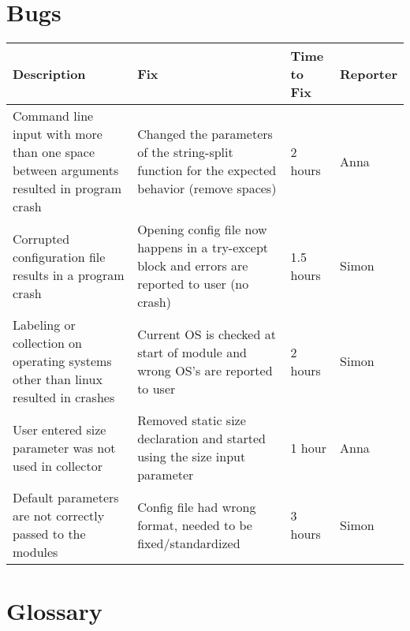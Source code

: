 \documentclass[parskip=full]{scrartcl}
\begin{document}
\section{Bugs}
\begin{tabular}{|p{4.5cm}|p{4.5cm}|p{2cm}|p{1.5cm}|}

\hline

 Description  & Fix & Time to Fix & Reporter  \\

\hline

Command line input with more than one space between arguments resulted in program crash & 
Changed the parameters of the string-split function for the expected behavior (remove spaces) &
2 hours &
Anna \\

\hline

Corrupted configuration file results in a program crash &
Opening config file now happens in a try-except block and errors are reported to user (no crash) &
1.5 hours &
Simon \\

\hline

Labeling or collection on operating systems other than linux resulted in crashes &
Current OS is checked at start of module and wrong OS's are reported to user &
2 hours &
Simon\\

\hline

User entered size parameter was not used in collector &
Removed static size declaration and started using the size input parameter &
1 hour &
Anna \\

\hline

Default parameters are not correctly passed to the modules &
Config file had wrong format, needed to be fixed/standardized &
3 hours &
Simon \\

\hline
\end{tabular}

\newpage
\section{Glossary}

%
\printnoidxglossaries
\end{document}

